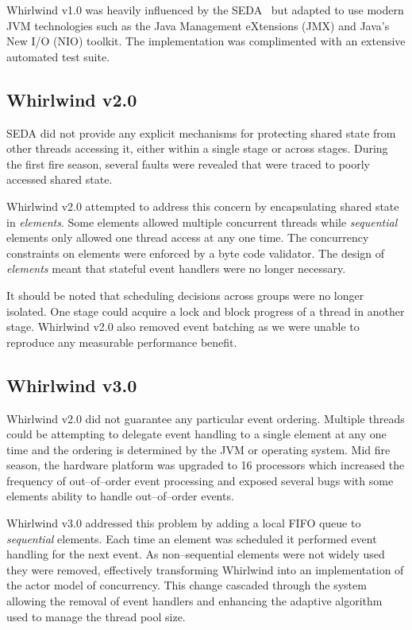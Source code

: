 \documentclass[conference]{IEEEtran}
\begin{document}
Whirlwind v1.0 was heavily influenced by the SEDA~\cite{welsh03Adaptive} but adapted to use modern JVM technologies such as the Java Management eXtensions (JMX) and Java's New I/O (NIO) toolkit. The implementation was complimented with an extensive automated test suite. 

\subsection{Whirlwind v2.0}

SEDA did not provide any explicit mechanisms for protecting shared state from other threads accessing it, either within a single stage or across stages. During the first fire season, several faults were revealed that were traced to poorly accessed shared state.

Whirlwind v2.0 attempted to address this concern by encapsulating shared state in \emph{elements}. Some elements allowed multiple concurrent threads while \emph{sequential} elements only allowed one thread access at any one time. The concurrency constraints on elements were enforced by a byte code validator. The design of \emph{elements} meant that stateful event handlers were no longer necessary.

It should be noted that scheduling decisions across groups were no longer isolated. One stage could acquire a lock and block progress of a thread in another stage. Whirlwind v2.0 also removed event batching as we were unable to reproduce any measurable performance benefit.

\subsection{Whirlwind v3.0}

Whirlwind v2.0 did not guarantee any particular event ordering. Multiple threads could be attempting to delegate event handling to a single element at any one time and the ordering is determined by the JVM or operating system. Mid fire season, the hardware platform was upgraded to 16 processors which increased the frequency of out--of--order event processing and exposed several bugs with some elements ability to handle out--of--order events. 

Whirlwind v3.0 addressed this problem by adding a local FIFO queue to \emph{sequential} elements. Each time an element was scheduled it performed event handling for the next event. As non--sequential elements were not widely used they were removed, effectively transforming Whirlwind into an implementation of the actor model of concurrency. This change cascaded through the system allowing the removal of event handlers and enhancing the adaptive algorithm used to manage the thread pool size. 
\end{document}
